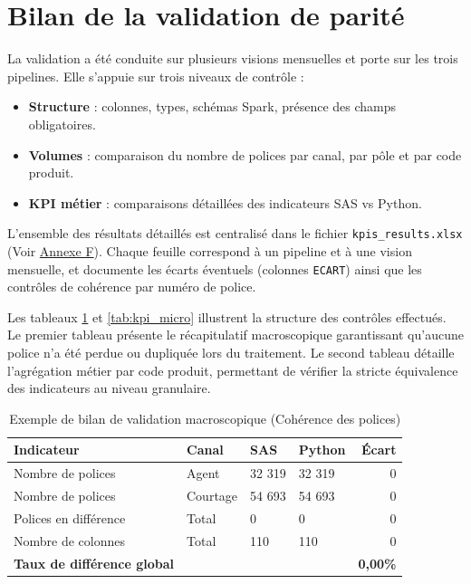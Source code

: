 \section{Bilan de la validation de parité}

La validation a été conduite sur plusieurs visions mensuelles et porte sur les
trois pipelines. Elle s’appuie sur trois niveaux de contrôle :

\begin{itemize}
    \item \textbf{Structure} : colonnes, types, schémas Spark, présence des champs obligatoires.
    \item \textbf{Volumes} : comparaison du nombre de polices par canal, par pôle et par code produit.
    \item \textbf{KPI métier} : comparaisons détaillées des indicateurs SAS vs Python.
\end{itemize}

L’ensemble des résultats détaillés est centralisé dans le fichier
\texttt{kpis\_results.xlsx} (Voir \hyperlink{annexe.F}{Annexe F}). Chaque feuille correspond à un pipeline et à une vision
mensuelle, et documente les écarts éventuels (colonnes \texttt{ECART}) ainsi que
les contrôles de cohérence par numéro de police.

Les tableaux \ref{tab:kpi_macro} et \ref{tab:kpi_micro} illustrent la structure des contrôles effectués. Le premier tableau présente le récapitulatif macroscopique garantissant qu'aucune police n'a été perdue ou dupliquée lors du traitement. Le second tableau détaille l'agrégation métier par code produit, permettant de vérifier la stricte équivalence des indicateurs au niveau granulaire.

\begin{table}[H]
    \centering
    \caption{Exemple de bilan de validation macroscopique (Cohérence des polices)}
    \label{tab:kpi_macro}
    \begin{tabularx}{\textwidth}{|l|l|X|X|r|}
        \hline
        \textbf{Indicateur} & \textbf{Canal} & \textbf{SAS} & \textbf{Python} & \textbf{Écart} \\
        \hline
        Nombre de polices & Agent & 32 319 & 32 319 & 0 \\
        \hline
        Nombre de polices & Courtage & 54 693 & 54 693 & 0 \\
        \hline
        Polices en différence & Total & 0 & 0 & 0 \\
        \hline
        Nombre de colonnes & Total & 110 & 110 & 0 \\
        \hline
        \textbf{Taux de différence global} & & & & \textbf{0,00\%} \\
        \hline
    \end{tabularx}
\end{table}

